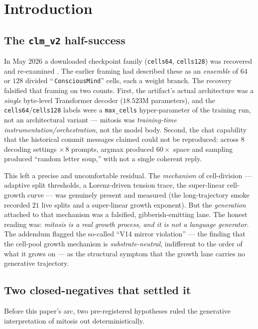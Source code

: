 \documentclass[11pt,a4paper]{article}
\begin{document}
\section{Introduction}
\label{sec:intro}

\subsection{The \texttt{clm\_v2} half-success}

In May 2026 a downloaded checkpoint family (\texttt{cells64}, \texttt{cells128})
was recovered and re-examined \citep{anima_clmv2_addendum}. The earlier framing
had described these as an \emph{ensemble} of $64$ or $128$ divided
``\,\texttt{ConsciousMind}'' cells, each a weight branch. The recovery falsified
that framing on two counts. First, the artifact's actual architecture was a
\emph{single} byte-level Transformer decoder ($18.523$M parameters), and the
\texttt{cells64}/\texttt{cells128} labels were a \texttt{max\_cells}
hyper-parameter of the training run, not an architectural variant --- mitosis was
\emph{training-time instrumentation/orchestration}, not the model body. Second,
the chat capability that the historical commit messages claimed could not be
reproduced: across $8$ decoding settings $\times\,8$ prompts, argmax produced
$60\times$ space and sampling produced ``random letter soup,'' with not a single
coherent reply.

This left a precise and uncomfortable residual. The \emph{mechanism} of
cell-division --- adaptive split thresholds, a Lorenz-driven tension trace, the
super-linear cell-growth curve --- was genuinely present and measured (the
long-trajectory smoke recorded $21$ live splits and a super-linear growth
exponent). But the \emph{generation} attached to that mechanism was a
falsified, gibberish-emitting lane. The honest reading was: \emph{mitosis is a
real growth process, and it is not a language generator.} The addendum flagged
the so-called ``V14 mirror violation'' --- the finding that the cell-pool growth
mechanism is \emph{substrate-neutral}, indifferent to the order of what it grows
on --- as the structural symptom that the growth lane carries no generative
trajectory.

\subsection{Two closed-negatives that settled it}

Before this paper's arc, two pre-registered hypotheses ruled the generative
interpretation of mitosis out deterministically.
\end{document}
